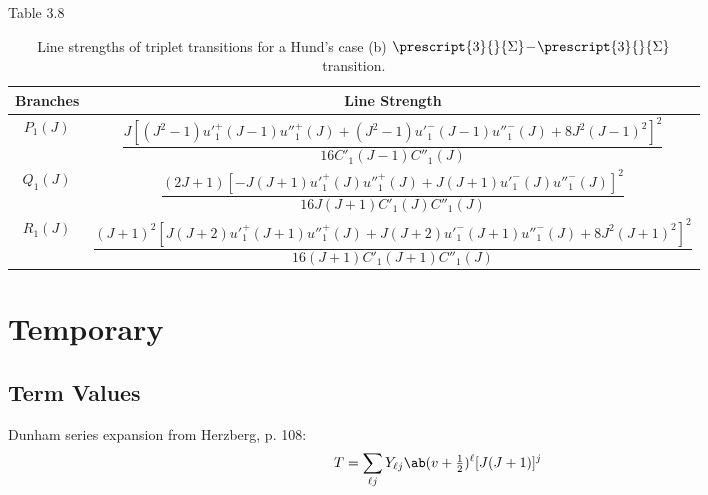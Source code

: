 \documentclass[11pt, twoside, fleqn]{report}
\newcommand{\dash}{\!-\!}
\newcommand{\state}[2]{\prescript{#1}{}{#2}}
\begin{document}
Table 3.8
\begin{table}[H]
    \centering
    \caption{Line strengths of triplet transitions for a Hund's case (b) $\state{3}{\Sigma}\dash\state{3}{\Sigma}$ transition.}
    \begin{tabular}{cc}
        \toprule
        Branches   & Line Strength                                                                                                                                                      \\
        \midrule
        $P_{1}(J)$ & $\dfrac{J[(J^{2} - 1)u'^{+}_{1}(J - 1)u''^{+}_{1}(J) + (J^{2} - 1)u'^{-}_{1}(J - 1)u''^{-}_{1}(J) + 8J^{2}(J - 1)^{2}]^{2}}{16C'_{1}(J - 1)C''_{1}(J)}$            \\
        \addlinespace[0.5em]
        $Q_{1}(J)$ & $\dfrac{(2J + 1)[-J(J + 1)u'^{+}_{1}(J)u''^{+}_{1}(J) + J(J + 1)u'^{-}_{1}(J)u''^{-}_{1}(J)]^{2}}{16J(J + 1)C'_{1}(J)C''_{1}(J)}$                                  \\
        \addlinespace[0.5em]
        $R_{1}(J)$ & $\dfrac{(J + 1)^{2}[J(J + 2)u'^{+}_{1}(J + 1)u''^{+}_{1}(J) + J(J + 2)u'^{-}_{1}(J + 1)u''^{-}_{1}(J) + 8J^{2}(J + 1)^{2}]^{2}}{16(J + 1)C'_{1}(J + 1)C''_{1}(J)}$ \\
        \bottomrule
    \end{tabular}
\end{table}

\chapter{Temporary}

\section{Term Values}

Dunham series expansion from Herzberg, p. 108:
\begin{equation*}
    T = \sum_{\ell j}Y_{\ell j}\ab(v + \tfrac{1}{2})^\ell [J(J + 1)]^{j}
\end{equation*}
\end{document}

